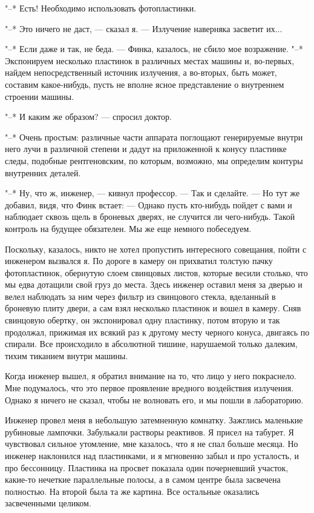 "--* Есть! Необходимо использовать фотопластинки.

"--* Это ничего не даст, --- сказал я. --- Излучение наверняка засветит их...

"--* Если даже и так, не беда. --- Финка, казалось, не сбило мое возражение.
"--* Экспонируем несколько пластинок в различных местах машины и,  во-первых,
найдем непосредственный  источник  излучения,  а  во-вторых,  быть  может,
составим какое-нибудь, пусть не вполне ясное  представление  о  внутреннем
строении машины.

"--* И каким же образом? --- спросил доктор.

"--* Очень простым: различные части аппарата поглощают генерируемые внутри
него лучи в различной степени и дадут на приложенной  к  конусу  пластинке
следы, подобные рентгеновским, по которым, возможно, мы определим  контуры
внутренних деталей.

"--* Ну, что ж, инженер, --- кивнул профессор. --- Так и сделайте. --- Но тут же
добавил, видя, что Финк встает: --- Однако пусть кто-нибудь пойдет с вами  и
наблюдает сквозь щель в броневых дверях, не случится ли чего-нибудь. Такой
контроль на будущее обязателен. Мы же еще немного побеседуем.

Поскольку, казалось, никто не хотел пропустить  интересного  совещания,
пойти с инженером вызвался я. По дороге  в  камеру  он  прихватил  толстую
пачку фотопластинок, обернутую  слоем  свинцовых  листов,  которые  весили
столько, что мы едва дотащили свой груз до места.  Здесь  инженер  оставил
меня за дверью и велел наблюдать за ним через фильтр из свинцового стекла,
вделанный в броневую плиту двери, а сам взял несколько пластинок и вошел в
камеру. Сняв свинцовую обертку,  он  экспонировал  одну  пластинку,  потом
вторую и так продолжал, прижимая их всякий раз  к  другому  месту  черного
конуса,  двигаясь  по  спирали.  Все  происходило  в  абсолютной   тишине,
нарушаемой только далеким, тихим тиканием внутри машины.

Когда инженер вышел,  я  обратил  внимание  на  то,  что  лицо  у  него
покраснело. Мне подумалось, что это первое проявление вредного воздействия
излучения. Однако я ничего не сказал, чтобы не волновать его, и мы пошли в
лабораторию.

Инженер  провел  меня  в  небольшую  затемненную   комнатку.   Зажглись
маленькие рубиновые лампочки. Забулькали растворы реактивов. Я  присел  на
табурет. Я чувствовал сильное утомление,  мне  казалось,  что  я  не  спал
больше месяца. Но инженер наклонился над пластинками, и я мгновенно  забыл
и про усталость, и про бессонницу.  Пластинка  на  просвет  показала  один
почерневший участок, какие-то нечеткие  параллельные  полосы,  а  в  самом
центре была засвечена  полностью.  На  второй  была  та  же  картина.  Все
остальные оказались засвеченными целиком.

